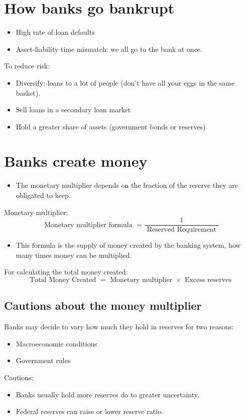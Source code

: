 \documentclass[openany]{book}
\begin{document}
\section{How banks go bankrupt}
\begin{itemize}
    \item High rate of loan defaults 
    \item Asset-liability time mismatch: we all go to the bank at once.
\end{itemize}
To reduce risk: 
\begin{itemize}
    \item Diversify: loans to a lot of people (don't have all your eggs in the same basket).
    \item Sell loans in a secondary loan market 
    \item Hold a greater share of assets (government bonds or reserves)
\end{itemize}

\section{Banks create money}
\begin{itemize}
    \item The monetary multiplier depends on the fraction of the reserve they are obligated to keep.
\end{itemize}
Monetary multiplier: 
\[
  \text{ Monetary multiplier formula } = \frac{1}{\text{ Reserved Requirement }} 
\]
\begin{itemize}
    \item This formula is the supply of money created by the banking system, how many times money can be multiplied.
\end{itemize}
For calculating the total money created: 
\[
  \text{ Total Money Created } = \text{ Monetary multiplier } \times \text{ Excess reserves }
\]

\subsection{Cautions about the money multiplier}
Banks may decide to vary how much they hold in reserves for two reasons: 
\begin{itemize}
    \item Macroeconomic conditions 
    \item Government rules 
\end{itemize}
Cautions:
\begin{itemize}
    \item Banks usually hold more reserves do to greater uncertainty. 
    \item Federal reserves can raise or lower reserve ratio. 
\end{itemize}
\end{document}

